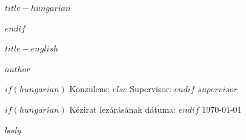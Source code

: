 \begin{frontmatter}
\begin{titlepage}
\begin{center}
    {\bfseries\fontsize{18}{22}\selectfont \textsc{$title-hungarian$}}
\end{center}

$endif$

\vspace*{1cm}
\begin{center}
    
    {\bfseries\fontsize{18}{22}\selectfont \textsc{$title-english$}}
\end{center}

\vspace*{1cm}
\begin{center}
    
    {\fontsize{16}{22}\selectfont \textsc{$author$}}

\end{center}

\vspace*{3cm}
\begin{center}
    
    {\fontsize{16}{22}\selectfont 
    $if(hungarian)$
    Konzulens: 
    $else$
    Supervisor:
    $endif$
    $supervisor$}
\end{center}


\begin{center}
    \vspace*{\fill}
    {\fontsize{14}{20}\selectfont 
    $if(hungarian)$
    Kézirat lezárásának dátuma:
    $endif$
    \today}
\end{center}
\end{titlepage}

\newpage


\newpage
\setcounter{page}{1}
{
  \hypersetup{linkcolor=black}
  \tableofcontents
}

\newpage

{
  \hypersetup{linkcolor=black}
  \listoffigures
}

{
  \hypersetup{linkcolor=black}
  \listoftables
}

\newpage

$body$

\printbibliography


    
\end{frontmatter}